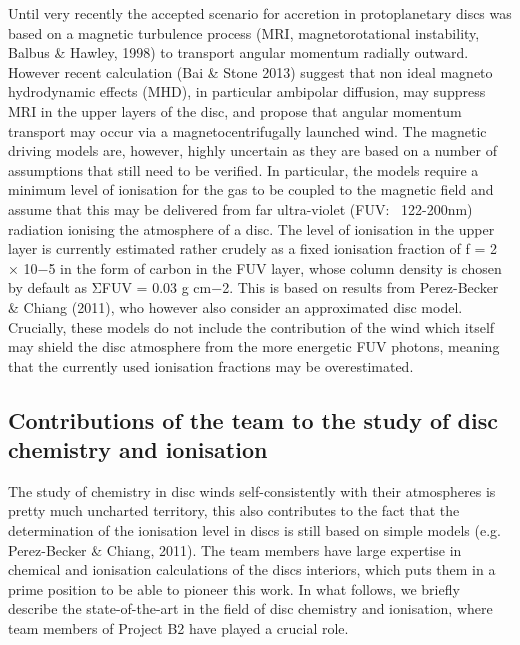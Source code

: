 \documentclass[10pt,fleqn,twoside]{article}
\begin{document}
Until very recently the accepted scenario for accretion in protoplanetary discs was based on a magnetic turbulence process (MRI, magnetorotational instability, Balbus \& Hawley, 1998) to transport angular momentum radially outward. However recent calculation (Bai \& Stone 2013) suggest that non ideal magneto hydrodynamic effects (MHD), in particular ambipolar diffusion, may suppress MRI in the upper layers of the disc, and propose that angular momentum transport may occur via a magnetocentrifugally launched wind. The magnetic driving models are, however, highly uncertain as they are based on a number of assumptions that still need to be verified. In particular, the models require a minimum level of ionisation for the gas to be coupled to the magnetic field and assume that this may be delivered from far ultra-violet (FUV: ~122-200nm) radiation ionising the atmosphere of a disc. The level of ionisation in the upper layer is currently estimated rather crudely as a fixed ionisation fraction of f = 2 × 10−5 in the form of carbon in the FUV layer, whose column density is chosen by default as ΣFUV = 0.03 g cm−2. This is based on results from Perez-Becker \& Chiang (2011), who however also consider an approximated disc model. Crucially, these models do not include the contribution of the wind which itself may shield the disc atmosphere from the more energetic FUV photons, meaning that the currently used ionisation fractions may be overestimated.

\subsection{Contributions of the team to the study of disc chemistry and ionisation}
The study of chemistry in disc winds self-consistently with their atmospheres is pretty much uncharted territory, this also contributes to the fact that the determination of the ionisation level in discs is still based on simple models (e.g. Perez-Becker \& Chiang, 2011). The team members have large expertise in chemical and ionisation calculations of the discs interiors, which puts them in a prime position to be able to pioneer this work. In what follows, we briefly describe the state-of-the-art in the field of disc chemistry and ionisation, where team members of Project B2 have played a crucial role. 

\end{document}
